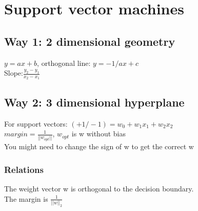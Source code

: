 \section{Support vector machines}
\subsection{Way 1: 2 dimensional geometry}
$y=ax+b$, orthogonal line: $y=-1/ax+c$\\ Slope:$\frac{y_{2}-
y_{1}}{x_{2}-
x_{1}}$
\subsection{Way 2: 3 dimensional hyperplane}
For support vectors: $(+1/-1) = w_{0}+ w_{1}x_{1}+ w_{2}x_{2}$\\ $margin = \frac{1}{||w_{opt}||}$,
$w_{opt}$ is w without bias\\ You might need to change the sign of w to get the correct
w\\
\subsubsection{Relations}
The weight vector w is orthogonal to the decision boundary.\\ The margin is
$\frac{1}{||w||_{2}}$\\